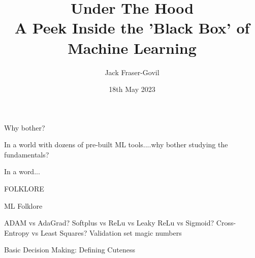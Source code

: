\documentclass[]{SangerLibrary/sanger-present}
\title{\Huge Under The Hood\\ {\footnotesize A Peek Inside the 'Black Box' of Machine Learning}}
\author{\large Jack Fraser-Govil}
\institute{The Wellcome Sanger Institute, Hinxton, UK}
\date{\small 18th May 2023}
\def\cuteB{-3}
\def\cuteWA{0}
\def\cuteWB{1}
\def\learn{0.01}
\newcommand\cute[5]
	{
		\def\cuteLabel{#5}
		\def\labelText{Not Cute}
		\ifnum\cuteLabel=1
			\def\labelText{Cute}
		\fi
		\node at ({#1},{#2}) {\texttt{[image: \#3]}};
		
		\def\test{#4}
		\def\comp{\highlight}




		\ifnum\test=\comp

			\FPeval{dot}{(\a) + (#1*(\b)) + (#2*(\c))}
			\def\cuteGuess{0}
			\pgfmathparse{\dot<0}

			\ifnum\pgfmathresult=0
				\def\cuteGuess{1}
			\fi
			\def\guessText{Not Cute}
			\if\cuteGuess1
				\def\guessText{Cute}
			\fi
			
			\def\highcolour{\wrongcolour}
			\ifnum\cuteGuess=\cuteLabel
				\def\highcolour{\rightcolour}
			\else

				\xdef\updated{1}
				\FPeval{bup}{(\cuteB) + ((\cuteLabel)-(\cuteGuess))*(\learn)}
				\FPeval{waup}{(\cuteWA) + ((\cuteLabel)-(\cuteGuess))*(\learn)*(#1)}
				\FPeval{wbup}{(\cuteWB) + ((\cuteLabel)-(\cuteGuess))*(\learn)*(#2)}
				\xdef\cuteB{\bup}
				\xdef\cuteWA{\waup}
				\xdef\cuteWB{\wbup}
			\fi
			\fill[\highcolour,opacity=0.2] ({#1},{#2}) circle (1.3);
			
			\node at ({#1},{#2+1.1}) {\tiny Labelled: \labelText, Guess \guessText};
		\else
		\fi
		
	}
\def\highlight{0}
\def\rightcolour{green!70!black}
\def\wrongcolour{red!70!black}
\def\highcolour{\rightcolour}
\newcommand\animals{
	\cute{0.7}{3.5}{mouse}{1}{1}
	\cute{2}{6}{rabbit}{2}{1}
	\cute{6}{5.7}{dog}{3}{1}
	\cute{4}{5.8}{cat}{4}{1}
	\cute{9}{5.5}{lion}{5}{0}
	\cute{10}{1}{whale}{6}{0}
	\cute{7}{2.7}{warthog}{7}{0}
	\cute{1.7}{1}{molerat}{8}{0}
	\cute{4}{2}{ayeaye}{9}{0}
	\cute{0.1}{0.1}{ant}{10}{0}
}
\begin{document}
	\maketitlepage

	\begin{frame}{Why bother?}


		In a world with dozens of pre-built ML tools....why bother studying the fundamentals?

		\pause In a word...
		\pause\begin{center}
			\LARGE FOLKLORE
		\end{center}
	\end{frame}
	\begin{frame}{ML Folklore}
		\begin{itemize}
			\pitem ADAM vs AdaGrad?
			\pitem Softplus vs ReLu vs Leaky ReLu vs Sigmoid?
			\pitem Cross-Entropy vs Least Squares?
			\pitem Validation set magic numbers
		\end{itemize}
	\end{frame}

	\begin{frame}{Basic Decision Making: Defining Cuteness}

		
		\begin{center}
			\def\w{8}
		\end{center}

	\end{frame}
\end{document}
